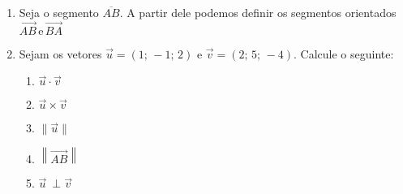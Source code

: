 \documentclass[a4paper, 12pt]{article}
\begin{document}
	\begin{enumerate}
	
	\item Seja o segmento $\overline{AB}$. A partir dele podemos definir os segmentos orientados $\overrightarrow{AB} \,\textrm{e}\, \overrightarrow{BA}$
	
	\item Sejam os vetores $\vec{u} = (1; \, -1; \, 2)$ e $\vec{v} = (2;\, 5;\, -4)$.
	Calcule o seguinte:
	\begin{enumerate}
	\item $\vec{u} \cdot  \vec{v}$
	\item $\vec{u} \times \vec{v}$
	\item $\| \vec{u} \|$
	\item $ \left\| \overrightarrow{AB}\right\| $
	\item $\vec{u} \ \perp \vec{v} $
	\end{enumerate}
	\end{enumerate}
\end{document}
